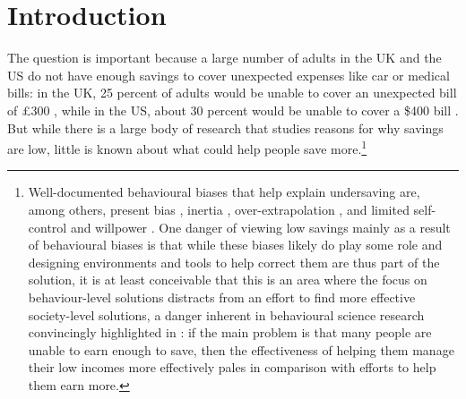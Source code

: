 \section{Introduction}%
\label{sec:introduction}



The question is important because a large number of adults in the UK and the US
do not have enough savings to cover unexpected expenses like car or medical
bills: in the UK, 25 percent of adults would be unable to cover an unexpected
bill of \pounds300 \citep{philipps2021supporting}, while in the US, about 30
percent would be unable to cover a \$400 bill \citep{fed2022economic}. But
while there is a large body of research that studies reasons for why savings
are low, little is known about what could help people save
more.\footnote{Well-documented behavioural biases that help explain undersaving
    are, among others, present bias \citep{laibson1997golden,
    laibson2019intertemporal}, inertia \citep{madrian2001power},
    over-extrapolation \citep{choi2009reinforcement}, and limited self-control
    and willpower \citep{thaler1981economic, benhabib2005modeling,
    fudenberg2006dual, loewenstein2004animal, gul2001temptation}. One danger of
    viewing low savings mainly as a result of behavioural biases is that while
    these biases likely do play some role and designing environments and tools
    to help correct them are thus part of the solution, it is at least
    conceivable that this is an area where the focus on behaviour-level
    solutions distracts from an effort to find more effective society-level
    solutions, a danger inherent in behavioural science research convincingly
    highlighted in \citet{chater2022frame}: if the main problem is that many
people are unable to earn enough to save, then the effectiveness of helping
them manage their low incomes more effectively pales in comparison with efforts
to help them earn more.}


